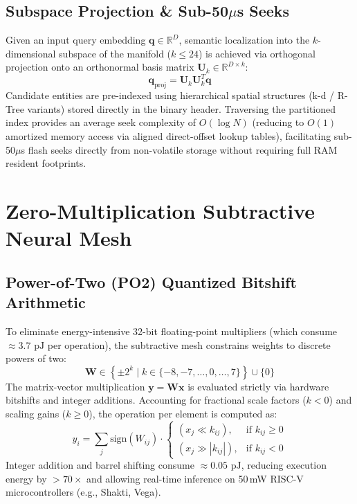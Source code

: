 \documentclass[11pt,a4paper]{article}
\theoremstyle{definition}
\begin{document}
\subsection{Subspace Projection \& Sub-50$\mu$s Seeks}
Given an input query embedding $\mathbf{q} \in \mathbb{R}^D$, semantic localization into the $k$-dimensional subspace of the manifold ($k \le 24$) is achieved via orthogonal projection onto an orthonormal basis matrix $\mathbf{U}_{k} \in \mathbb{R}^{D \times k}$:
\begin{equation}
\mathbf{q}_{\text{proj}} = \mathbf{U}_{k} \mathbf{U}_{k}^T \mathbf{q}
\end{equation}
Candidate entities are pre-indexed using hierarchical spatial structures (k-d / R-Tree variants) stored directly in the binary header. Traversing the partitioned index provides an average seek complexity of $O(\log N)$ (reducing to $O(1)$ amortized memory access via aligned direct-offset lookup tables), facilitating sub-50$\mu$s flash seeks directly from non-volatile storage without requiring full RAM resident footprints.

\section{Zero-Multiplication Subtractive Neural Mesh}

\subsection{Power-of-Two (PO2) Quantized Bitshift Arithmetic}
To eliminate energy-intensive 32-bit floating-point multipliers (which consume $\approx 3.7\text{ pJ}$ per operation), the subtractive mesh constrains weights to discrete powers of two:
\begin{equation}
\mathbf{W} \in \left\{ \pm 2^k \mid k \in \{-8, -7, \dots, 0, \dots, 7\} \right\} \cup \{0\}
\end{equation}
The matrix-vector multiplication $\mathbf{y} = \mathbf{W}\mathbf{x}$ is evaluated strictly via hardware bitshifts and integer additions. Accounting for fractional scale factors ($k < 0$) and scaling gains ($k \ge 0$), the operation per element is computed as:
\begin{equation}
y_i = \sum_{j} \text{sign}(W_{ij}) \cdot 
\begin{cases} 
(x_j \ll k_{ij}), & \text{if } k_{ij} \ge 0 \\ 
(x_j \gg |k_{ij}|), & \text{if } k_{ij} < 0 
\end{cases}
\end{equation}
Integer addition and barrel shifting consume $\approx 0.05\text{ pJ}$, reducing execution energy by $>70\times$ and allowing real-time inference on 50\,mW RISC-V microcontrollers (e.g., Shakti, Vega).
\end{document}
